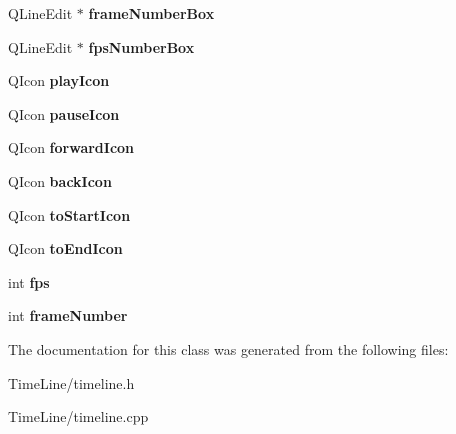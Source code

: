 \begin{DoxyCompactItemize}
\item 
\hypertarget{class_time_line_a47d494f9fd2cc580920441ee827e66bf}{
\-Q\-Line\-Edit $\ast$ {\bfseries frame\-Number\-Box}}
\label{class_time_line_a47d494f9fd2cc580920441ee827e66bf}

\item 
\hypertarget{class_time_line_a9cc94a9acbd3b24c77451852c91b9a97}{
\-Q\-Line\-Edit $\ast$ {\bfseries fps\-Number\-Box}}
\label{class_time_line_a9cc94a9acbd3b24c77451852c91b9a97}

\item 
\hypertarget{class_time_line_ac17e87325eb8b79f26f481e4e67ccab1}{
\-Q\-Icon {\bfseries play\-Icon}}
\label{class_time_line_ac17e87325eb8b79f26f481e4e67ccab1}

\item 
\hypertarget{class_time_line_a50c90dc1405981a28674eeda6ef6dd68}{
\-Q\-Icon {\bfseries pause\-Icon}}
\label{class_time_line_a50c90dc1405981a28674eeda6ef6dd68}

\item 
\hypertarget{class_time_line_abc53f02284dc1f03d53a012fda49a358}{
\-Q\-Icon {\bfseries forward\-Icon}}
\label{class_time_line_abc53f02284dc1f03d53a012fda49a358}

\item 
\hypertarget{class_time_line_a1400f11134722007776a3a070552a677}{
\-Q\-Icon {\bfseries back\-Icon}}
\label{class_time_line_a1400f11134722007776a3a070552a677}

\item 
\hypertarget{class_time_line_a86865fb74af82b4db1d2cfe8ebacecc6}{
\-Q\-Icon {\bfseries to\-Start\-Icon}}
\label{class_time_line_a86865fb74af82b4db1d2cfe8ebacecc6}

\item 
\hypertarget{class_time_line_a25b613da04783e713c3d42ca4556bc5b}{
\-Q\-Icon {\bfseries to\-End\-Icon}}
\label{class_time_line_a25b613da04783e713c3d42ca4556bc5b}

\item 
\hypertarget{class_time_line_a33d1af29fcd2b2234a3f48a78a87bf87}{
int {\bfseries fps}}
\label{class_time_line_a33d1af29fcd2b2234a3f48a78a87bf87}

\item 
\hypertarget{class_time_line_a4b81bb3143b4dca1f96679ba9fa11cf3}{
int {\bfseries frame\-Number}}
\label{class_time_line_a4b81bb3143b4dca1f96679ba9fa11cf3}

\end{DoxyCompactItemize}


\-The documentation for this class was generated from the following files\-:\begin{DoxyCompactItemize}
\item 
\-Time\-Line/timeline.\-h\item 
\-Time\-Line/timeline.\-cpp\end{DoxyCompactItemize}
